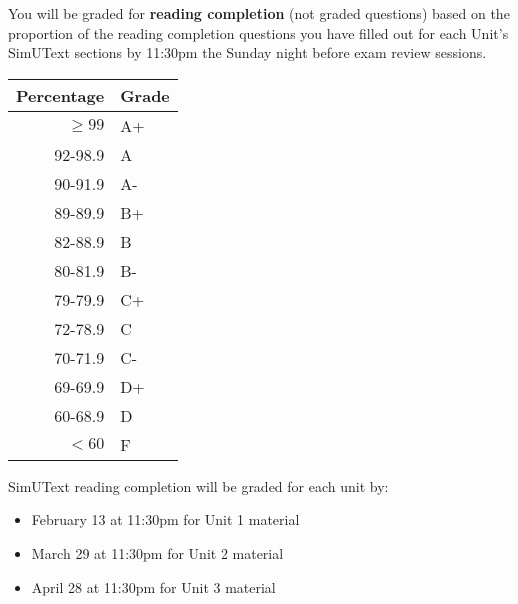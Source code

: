 \documentclass{tufte-handout}
\begin{document}
You will be graded for \textbf{reading completion} (not graded questions) based on the proportion of the reading completion questions you have filled out for each Unit's SimUText sections by 11:30pm the Sunday night before exam review sessions.



\begin{margintable}
\begin{tabular}{rl}
Percentage & Grade \\
\hline 
$\ge99$ & A+ \\
92-98.9 & A \\
90-91.9 & A- \\
89-89.9 & B+ \\
82-88.9 & B \\
80-81.9 & B- \\
79-79.9 & C+ \\
72-78.9 & C \\
70-71.9 & C- \\
69-69.9 & D+ \\
60-68.9 & D \\
$<60$ & F \\
\hline
\end{tabular}
\end{margintable}

SimUText reading completion will be graded for each unit by:
\begin{itemize}
\item February 13 at 11:30pm for Unit 1 material
\item March 29 at 11:30pm for Unit 2 material 
\item April 28 at 11:30pm for Unit 3 material 
\end{itemize}
\end{document}
